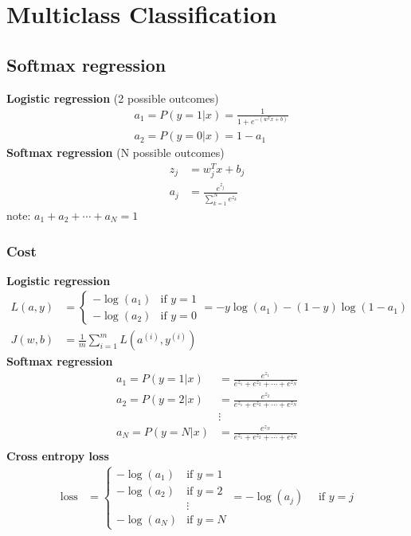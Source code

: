 \section{Multiclass Classification}
\subsection*{Softmax regression}
\noindent
\textbf{Logistic regression} (2 possible outcomes)
\begin{align*}
    &a_1 = P(y=1|x) = \frac{1}{1 + e^{-(w^Tx + b)}}\\
    &a_2 = P(y=0|x) = 1 - a_1
\end{align*}
\textbf{Softmax regression} (N possible outcomes)
\begin{align*}
    z_j &= w_j^Tx + b_j\\
    a_j &= \frac{e^{z_j}}{\sum_{k=1}^{N}e^{z_k}}
\end{align*}
note: $a_1 + a_2 + \cdots + a_N = 1$

\subsubsection*{Cost}
\noindent
\textbf{Logistic regression}
\begin{align*}
    L(a, y) &= \begin{cases} -\log(a_1) & \text{if } y = 1\\ 
        -\log(a_2) & \text{if } y = 0 \end{cases}=  -y \log(a_1) - (1 - y) \log(1 - a_1)\\
    J(w, b) &= \frac{1}{m}\sum_{i=1}^{m}L(a^{(i)}, y^{(i)})
\end{align*}
\textbf{Softmax regression}
\begin{align*}
    a_1 = P(y=1|x) &= \frac{e^{z_1}}{e^{z_1} + e^{z_2} + \cdots + e^{z_N}}\\
    a_2 = P(y=2|x) &= \frac{e^{z_2}}{e^{z_1} + e^{z_2} + \cdots + e^{z_N}}\\
    &\vdots\\
    a_N = P(y=N|x) &= \frac{e^{z_N}}{e^{z_1} + e^{z_2} + \cdots + e^{z_N}}\\
\end{align*}
\textbf{Cross entropy loss}
\begin{align*}
    \mathrm{loss} &= 
    \begin{cases}
        -\log(a_1) & \text{if } y = 1\\
        -\log(a_2) & \text{if } y = 2\\
        &\vdots \\
        -\log(a_N) & \text{if } y = N
    \end{cases}
    = -\log(a_j) \quad \text{ if } y = j
\end{align*}

